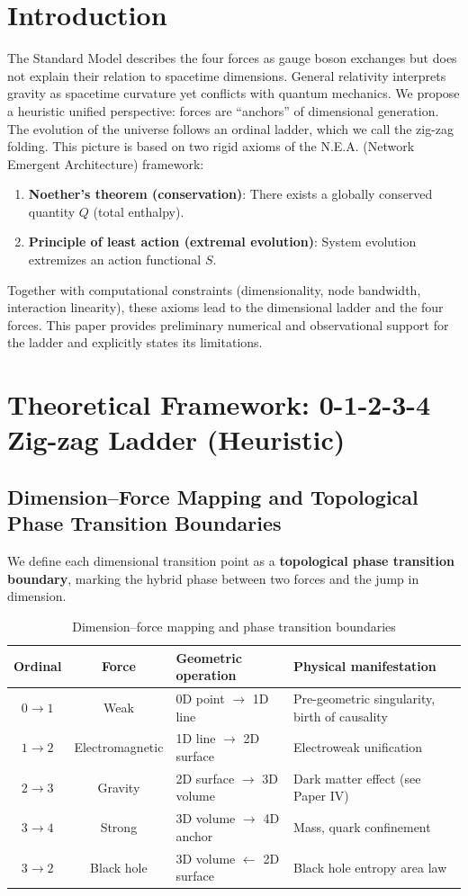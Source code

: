 \documentclass[12pt,a4paper]{article}
\begin{document}
\section{Introduction}
The Standard Model describes the four forces as gauge boson exchanges but does not explain their relation to spacetime dimensions. General relativity interprets gravity as spacetime curvature yet conflicts with quantum mechanics. We propose a heuristic unified perspective: forces are ``anchors'' of dimensional generation. The evolution of the universe follows an ordinal ladder, which we call the zig-zag folding. This picture is based on two rigid axioms of the N.E.A. (Network Emergent Architecture) framework:
\begin{enumerate}
    \item \textbf{Noether's theorem (conservation)}: There exists a globally conserved quantity $Q$ (total enthalpy).
    \item \textbf{Principle of least action (extremal evolution)}: System evolution extremizes an action functional $S$.
\end{enumerate}
Together with computational constraints (dimensionality, node bandwidth, interaction linearity), these axioms lead to the dimensional ladder and the four forces. This paper provides preliminary numerical and observational support for the ladder and explicitly states its limitations.

\section{Theoretical Framework: 0-1-2-3-4 Zig-zag Ladder (Heuristic)}
\subsection{Dimension–Force Mapping and Topological Phase Transition Boundaries}
We define each dimensional transition point as a \textbf{topological phase transition boundary}, marking the hybrid phase between two forces and the jump in dimension.

\begin{table}[H]
\centering
\caption{Dimension–force mapping and phase transition boundaries}
\begin{tabularx}{\textwidth}{c c X X}
\toprule
Ordinal & Force & Geometric operation & Physical manifestation \\
\midrule
$0\to1$ & Weak & 0D point $\to$ 1D line & Pre-geometric singularity, birth of causality \\
$1\to2$ & Electromagnetic & 1D line $\to$ 2D surface & Electroweak unification \\
$2\to3$ & Gravity & 2D surface $\to$ 3D volume & Dark matter effect (see Paper IV) \\
$3\to4$ & Strong & 3D volume $\to$ 4D anchor & Mass, quark confinement \\
$3\to2$ & Black hole & 3D volume $\leftarrow$ 2D surface & Black hole entropy area law \\
\bottomrule
\end{tabularx}
\end{table}
\end{document}
